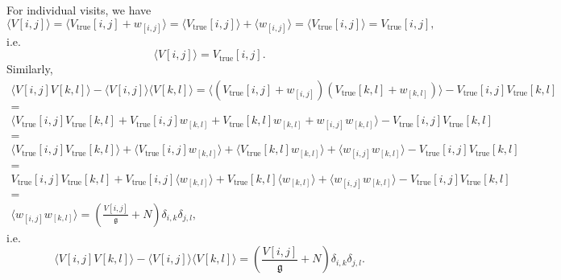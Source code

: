 \documentclass[times]{aastex6}
\begin{document}
For individual visits, we have
\begin{equation*}
  \langle V[i,j] \rangle = \langle V_{\mathrm{true}}[i,j] + w_{[i,j]} \rangle = \langle V_{\mathrm{true}}[i,j] \rangle + \langle w_{[i,j]} \rangle = \langle V_{\mathrm{true}}[i,j] \rangle = V_{\mathrm{true}}[i,j],
\end{equation*}
i.e.
\begin{equation}\label{eq:VisitMean}
  \langle V[i,j] \rangle = V_{\mathrm{true}}[i,j].
\end{equation}
Similarly,
\begin{multline*}
  \langle V[i,j]V[k,l] \rangle - \langle V[i,j] \rangle \langle V[k,l] \rangle = \langle (V_{\mathrm{true}}[i,j] + w_{[i,j]})(V_{\mathrm{true}}[k,l] + w_{[k,l]}) \rangle - V_{\mathrm{true}}[i,j]V_{\mathrm{true}}[k,l] \\ = \\ \langle V_{\mathrm{true}}[i,j]V_{\mathrm{true}}[k,l] + V_{\mathrm{true}}[i,j]w_{[k,l]} + V_{\mathrm{true}}[k,l]w_{[k,l]} + w_{[i,j]}w_{[k,l]} \rangle - V_{\mathrm{true}}[i,j]V_{\mathrm{true}}[k,l] \\ = \\ \langle V_{\mathrm{true}}[i,j]V_{\mathrm{true}}[k,l] \rangle + \langle V_{\mathrm{true}}[i,j]w_{[k,l]} \rangle + \langle V_{\mathrm{true}}[k,l]w_{[k,l]} \rangle + \langle w_{[i,j]}w_{[k,l]} \rangle - V_{\mathrm{true}}[i,j]V_{\mathrm{true}}[k,l] \\ = \\ V_{\mathrm{true}}[i,j]V_{\mathrm{true}}[k,l] + V_{\mathrm{true}}[i,j] \langle w_{[k,l]} \rangle + V_{\mathrm{true}}[k,l] \langle w_{[k,l]} \rangle + \langle w_{[i,j]}w_{[k,l]} \rangle - V_{\mathrm{true}}[i,j]V_{\mathrm{true}}[k,l] \\ = \\ \langle w_{[i,j]}w_{[k,l]} \rangle = \left ( \frac{V[i,j]}{\mathfrak{g}} + N \right )\delta_{i,k}\delta_{j,l},
\end{multline*}
i.e.
\begin{equation}\label{eq:VisitCovariance}
  \langle V[i,j]V[k,l] \rangle - \langle V[i,j] \rangle \langle V[k,l] \rangle = \left ( \frac{V[i,j]}{\mathfrak{g}} + N \right )\delta_{i,k}\delta_{j,l}.
\end{equation}

\medskip
\end{document}
